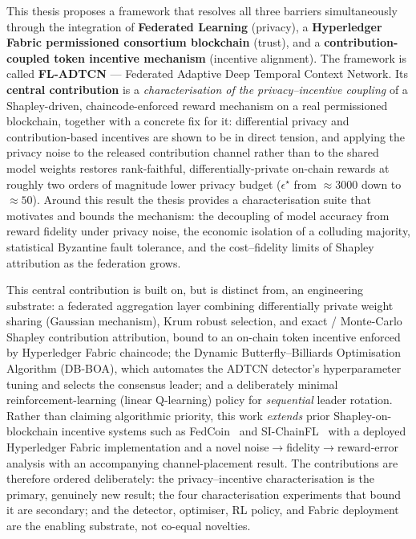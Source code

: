 This thesis proposes a framework that resolves all three barriers simultaneously through the integration of \textbf{Federated Learning} (privacy), a \textbf{Hyperledger Fabric permissioned consortium blockchain} (trust), and a \textbf{contribution-coupled token incentive mechanism} (incentive alignment). The framework is called \textbf{FL-ADTCN} — Federated Adaptive Deep Temporal Context Network. Its \textbf{central contribution} is a \emph{characterisation of the privacy--incentive coupling} of a Shapley-driven, chaincode-enforced reward mechanism on a real permissioned blockchain, together with a concrete fix for it: differential privacy and contribution-based incentives are shown to be in direct tension, and applying the privacy noise to the released contribution channel rather than to the shared model weights restores rank-faithful, differentially-private on-chain rewards at roughly two orders of magnitude lower privacy budget ($\epsilon^\star$ from $\approx 3000$ down to $\approx 50$). Around this result the thesis provides a characterisation suite that motivates and bounds the mechanism: the decoupling of model accuracy from reward fidelity under privacy noise, the economic isolation of a colluding majority, statistical Byzantine fault tolerance, and the cost--fidelity limits of Shapley attribution as the federation grows.

This central contribution is built on, but is distinct from, an engineering substrate: a federated aggregation layer combining differentially private weight sharing (Gaussian mechanism), Krum robust selection, and exact / Monte-Carlo Shapley contribution attribution, bound to an on-chain token incentive enforced by Hyperledger Fabric chaincode; the Dynamic Butterfly--Billiards Optimisation Algorithm (DB-BOA), which automates the ADTCN detector's hyperparameter tuning and selects the consensus leader; and a deliberately minimal reinforcement-learning (linear Q-learning) policy for \emph{sequential} leader rotation. Rather than claiming algorithmic priority, this work \emph{extends} prior Shapley-on-blockchain incentive systems such as FedCoin~\cite{fedcoin2020} and SI-ChainFL~\cite{zhao2026sichainfl} with a deployed Hyperledger Fabric implementation and a novel noise$\rightarrow$fidelity$\rightarrow$reward-error analysis with an accompanying channel-placement result. The contributions are therefore ordered deliberately: the privacy--incentive characterisation is the primary, genuinely new result; the four characterisation experiments that bound it are secondary; and the detector, optimiser, RL policy, and Fabric deployment are the enabling substrate, not co-equal novelties.

